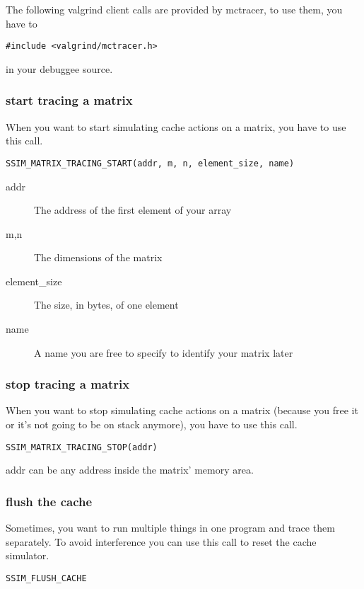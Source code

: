 
The following valgrind client calls are provided by mctracer, to use them, you have to
\begin{lstlisting}
#include <valgrind/mctracer.h>
\end{lstlisting}
in your debuggee source.

\subsubsection{start tracing a matrix}
When you want to start simulating cache actions on a matrix, you have to use this call.
\begin{lstlisting}
SSIM_MATRIX_TRACING_START(addr, m, n, element_size, name)
\end{lstlisting}
\begin{description}
\item[addr] The address of the first element of your array
\item[m,n] The dimensions of the matrix
\item[element\_size] The size, in bytes, of one element
\item[name] A name you are free to specify to identify your matrix later
\end{description}


\subsubsection{stop tracing a matrix}
When you want to stop simulating cache actions on a matrix (because you free it or it's not going to be on stack anymore), you have to use this call.
\begin{lstlisting}
SSIM_MATRIX_TRACING_STOP(addr)
\end{lstlisting}
addr can be any address inside the matrix' memory area.

\subsubsection{flush the cache}
Sometimes, you want to run multiple things in one program and trace them separately. To avoid interference you can use this call to reset the cache simulator.
\begin{lstlisting}
SSIM_FLUSH_CACHE
\end{lstlisting}

